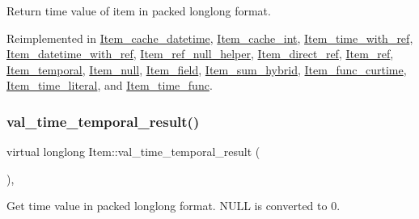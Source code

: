 Return time value of item in packed longlong format. 

Reimplemented in \mbox{\hyperlink{classItem__cache__datetime_a3a3dc978f89d305b26a866eebf2705a6}{Item\+\_\+cache\+\_\+datetime}}, \mbox{\hyperlink{classItem__cache__int_af7bbf9ca88eac67901bc1e7c5768392a}{Item\+\_\+cache\+\_\+int}}, \mbox{\hyperlink{classItem__time__with__ref_a9e41e41a7136e706ac9182203ea3063f}{Item\+\_\+time\+\_\+with\+\_\+ref}}, \mbox{\hyperlink{classItem__datetime__with__ref_ad4f0af48197792dcbd0ce0bbac488cbd}{Item\+\_\+datetime\+\_\+with\+\_\+ref}}, \mbox{\hyperlink{classItem__ref__null__helper_a310f77154e5867053304bd27d75cbb53}{Item\+\_\+ref\+\_\+null\+\_\+helper}}, \mbox{\hyperlink{classItem__direct__ref_af46d56da55778711183208f74fc592e9}{Item\+\_\+direct\+\_\+ref}}, \mbox{\hyperlink{classItem__ref_a962c929d6871099e06c7aa2868f09779}{Item\+\_\+ref}}, \mbox{\hyperlink{classItem__temporal_ac5adb00cf4d1f565f7b858bef7c0a968}{Item\+\_\+temporal}}, \mbox{\hyperlink{classItem__null_a9e65f0e26156a43bcb6c4d915389662d}{Item\+\_\+null}}, \mbox{\hyperlink{classItem__field_a9d9f8e906fb2f056b1bb4e907d8c783b}{Item\+\_\+field}}, \mbox{\hyperlink{classItem__sum__hybrid_a8de5e52f6be6c1d1e58a6f86b24c073f}{Item\+\_\+sum\+\_\+hybrid}}, \mbox{\hyperlink{classItem__func__curtime_a58e6e51156871d1b5e844993c88cf053}{Item\+\_\+func\+\_\+curtime}}, \mbox{\hyperlink{classItem__time__literal_a38682be97c3300d176410c59ca436c1b}{Item\+\_\+time\+\_\+literal}}, and \mbox{\hyperlink{classItem__time__func_ac6f281d250770126e010750dff54ef36}{Item\+\_\+time\+\_\+func}}.

\mbox{\label{classItem_a9d011d3f1d2498f46bbdc4c06d47d5f0}} 
\subsubsection{\texorpdfstring{val\+\_\+time\+\_\+temporal\+\_\+result()}{val\_time\_temporal\_result()}}
{\footnotesize\ttfamily virtual longlong Item\+::val\+\_\+time\+\_\+temporal\+\_\+result (\begin{DoxyParamCaption}{ }\end{DoxyParamCaption})\hspace{0.3cm}{\ttfamily [inline]}, {\ttfamily [virtual]}}

Get time value in packed longlong format. N\+U\+LL is converted to 0. 

